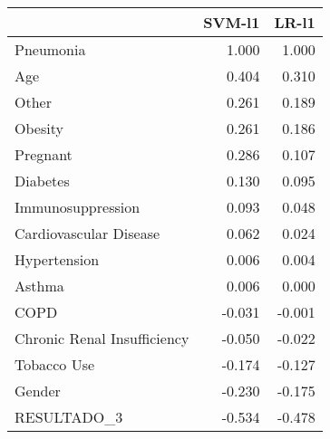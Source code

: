 \begin{tabular}{lrr}
\toprule
{} &  SVM-l1 &  LR-l1 \\
\midrule
Pneumonia                   &   1.000 &  1.000 \\
Age                         &   0.404 &  0.310 \\
Other                       &   0.261 &  0.189 \\
Obesity                     &   0.261 &  0.186 \\
Pregnant                    &   0.286 &  0.107 \\
Diabetes                    &   0.130 &  0.095 \\
Immunosuppression           &   0.093 &  0.048 \\
Cardiovascular Disease      &   0.062 &  0.024 \\
Hypertension                &   0.006 &  0.004 \\
Asthma                      &   0.006 &  0.000 \\
COPD                        &  -0.031 & -0.001 \\
Chronic Renal Insufficiency &  -0.050 & -0.022 \\
Tobacco Use                 &  -0.174 & -0.127 \\
Gender                      &  -0.230 & -0.175 \\
RESULTADO\_3                 &  -0.534 & -0.478 \\
\bottomrule
\end{tabular}

